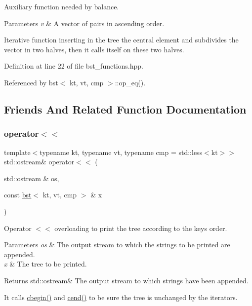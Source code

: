 Auxiliary function needed by balance. 


\begin{DoxyParams}{Parameters}
{\em v} & A vector of pairs in ascending order.\\
\hline
\end{DoxyParams}
Iterative function inserting in the tree the central element and subdivides the vector in two halves, then it calls itself on these two halves. 

Definition at line 22 of file bst\+\_\+functions.\+hpp.



Referenced by bst$<$ kt, vt, cmp $>$\+::op\+\_\+eq().



\subsection{Friends And Related Function Documentation}
\mbox{\label{classbst_ae4b7d69364fca0855f74abdcad674ebf}} 
\subsubsection{\texorpdfstring{operator$<$$<$}{operator<<}}
{\footnotesize\ttfamily template$<$typename kt, typename vt, typename cmp = std\+::less$<$kt$>$$>$ \\
std\+::ostream\& operator$<$$<$ (\begin{DoxyParamCaption}\item[{std\+::ostream \&}]{os,  }\item[{const \hyperlink{classbst}{bst}$<$ kt, vt, cmp $>$ \&}]{x }\end{DoxyParamCaption})\hspace{0.3cm}{\ttfamily [friend]}}



Operator $<$$<$ overloading to print the tree according to the keys order. 


\begin{DoxyParams}{Parameters}
{\em os} & The output stream to which the strings to be printed are appended. \\
\hline
{\em x} & The tree to be printed. \\
\hline
\end{DoxyParams}
\begin{DoxyReturn}{Returns}
std\+::ostream\& The output stream to which strings have been appended.
\end{DoxyReturn}
It calls \hyperlink{classbst_a74e78aa7f879a5df0b933651174de42b}{cbegin()} and \hyperlink{classbst_a2f78931b69f0a121823b60393f1b9745}{cend()} to be sure the tree is unchanged by the iterators. 

